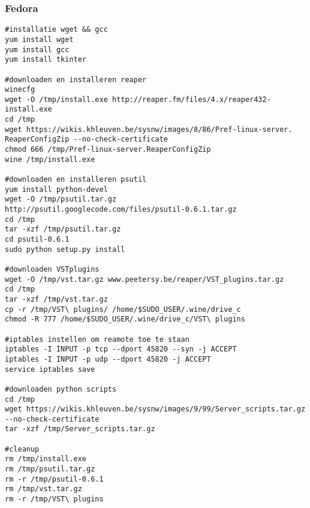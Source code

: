 \documentclass[DIV=calc]{scrartcl}
\begin{document}
\subsubsection{Fedora}
\begin{lstlisting}[caption={Script-fedora-32bit.sh}, label=Fedora installatiescript 32bit]
#installatie wget && gcc
yum install wget
yum install gcc
yum install tkinter
 
#downloaden en installeren reaper
winecfg
wget -O /tmp/install.exe http://reaper.fm/files/4.x/reaper432-install.exe
cd /tmp
wget https://wikis.khleuven.be/sysnw/images/8/86/Pref-linux-server.
ReaperConfigZip --no-check-certificate
chmod 666 /tmp/Pref-linux-server.ReaperConfigZip
wine /tmp/install.exe
 
#downloaden en installeren psutil
yum install python-devel
wget -O /tmp/psutil.tar.gz 
http://psutil.googlecode.com/files/psutil-0.6.1.tar.gz
cd /tmp
tar -xzf /tmp/psutil.tar.gz
cd psutil-0.6.1
sudo python setup.py install
 
#downloaden VSTplugins
wget -O /tmp/vst.tar.gz www.peetersy.be/reaper/VST_plugins.tar.gz
cd /tmp
tar -xzf /tmp/vst.tar.gz
cp -r /tmp/VST\ plugins/ /home/$SUDO_USER/.wine/drive_c
chmod -R 777 /home/$SUDO_USER/.wine/drive_c/VST\ plugins
 
#iptables instellen om reamote toe te staan
iptables -I INPUT -p tcp --dport 45820 --syn -j ACCEPT
iptables -I INPUT -p udp --dport 45820 -j ACCEPT
service iptables save
 
#downloaden python scripts
cd /tmp
wget https://wikis.khleuven.be/sysnw/images/9/99/Server_scripts.tar.gz 
--no-check-certificate
tar -xzf /tmp/Server_scripts.tar.gz
 
#cleanup
rm /tmp/install.exe
rm /tmp/psutil.tar.gz
rm -r /tmp/psutil-0.6.1
rm /tmp/vst.tar.gz
rm -r /tmp/VST\ plugins
\end{lstlisting}
\end{document}
